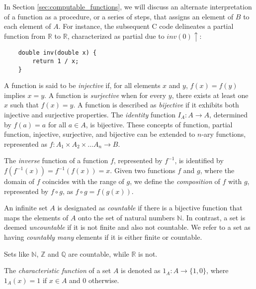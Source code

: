 \begin{example}
In Section \ref{sec:computable_functions}, we will discuss an alternate interpretation of a function as a procedure, or a series of steps, that assigns an element of $B$ to each element of $A$. For instance, the subsequent C code delineates a partial function from $\mathbb{R}$ to $\mathbb{R}$, characterized as partial due to $inv(0)\uparrow$:
\begin{verbatim}
    double inv(double x) {
        return 1 / x;
    }
\end{verbatim}
\end{example}

A function is said to be \emph{injective} if, for all elements $x$ and $y$, $f(x) = f(y)$ implies $x=y$. A function is \emph{surjective} when for every $y$, there exists at least one $x$ such that $f(x) = y$. A function is described as \emph{bijective} if it exhibits both injective and surjective properties. The \emph{identity} function $I_A : A \rightarrow A$, determined by $f(a) = a$ for all $a \in A$, is bijective. These concepts of function, partial function, injective, surjective, and bijective can be extended to $n$-ary functions, represented as $f: A_1 \times A_2 \times \dots A_n \rightarrow B$.

The \emph{inverse} function of a function $f$, represented by $f^{-1}$, is identified by $f(f^{-1}(x)) = f^{-1}(f(x)) = x$. Given two functions $f$ and $g$, where the domain of $f$ coincides with the range of $g$, we define the \emph{composition} of $f$ with $g$, represented by $f \circ g$, as $f \circ g = f(g(x))$.

An infinite set $A$ is designated as \emph{countable} if there is a bijective function that maps the elements of $A$ onto the set of natural numbers $\mathbb{N}$. In contrast, a set is deemed \emph{uncountable} if it is not finite and also not countable. We refer to a set as having \emph{countably many} elements if it is either finite or countable.

\begin{example}
Sets like $\mathbb{N}$, $\mathbb{Z}$ and $\mathbb{Q}$ are countable, while $\mathbb{R}$ is not.
\end{example}

The \emph{characteristic function} of a set $A$ is denoted as $1_A : A \rightarrow \{1, 0\}$, where $1_A(x) = 1$ if $x \in A$ and $0$ otherwise.

